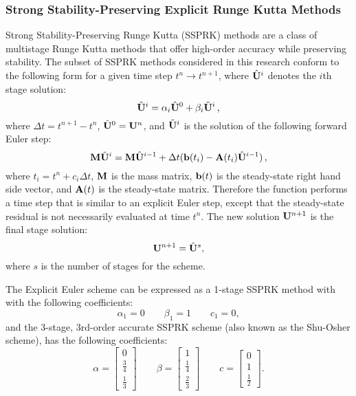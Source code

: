 \subsubsection{Strong Stability-Preserving Explicit Runge Kutta Methods}
\label{ssprk}
Strong Stability-Preserving Runge Kutta (SSPRK) methods are a class of multistage
Runge Kutta methods that offer high-order accuracy while preserving stability.
The subset of SSPRK methods considered in this research conform to the
following form for a given time step $t^n\rightarrow t^{n+1}$,
where $\hat{\mathbf{U}}^i$ denotes the $i$th stage solution:
\begin{equation}
   \hat{\mathbf{U}}^i = \alpha_i\hat{\mathbf{U}}^0
   + \beta_i\tilde{\mathbf{U}}^i \,,
\end{equation}
where $\Delta t=t^{n+1}-t^n$, $\hat{\mathbf{U}}^0=\mathbf{U}^n$,
and $\tilde{\mathbf{U}}^i$ is the solution of the following forward Euler
step:
\begin{equation}
   \mathbf{M}\tilde{\mathbf{U}}^i = \mathbf{M}\hat{\mathbf{U}}^{i-1}
   + \Delta t(\mathbf{b}(t_i) - \mathbf{A}(t_i)\hat{\mathbf{U}}^{i-1}) \,,
\end{equation}
where $t_i = t^n+c_i\Delta t$,
$\mathbf{M}$ is the mass matrix, $\mathbf{b}(t)$ is the steady-state
right hand side vector, and $\mathbf{A}(t)$ is the steady-state matrix.
Therefore the function performs a time step that is similar to an
explicit Euler step, except that the steady-state residual is not
necessarily evaluated at time $t^n$. The new solution $\mathbf{U}^{n+1}$
is the final stage solution:
\begin{equation}
   \mathbf{U}^{n+1} = \hat{\mathbf{U}}^s,
\end{equation}
where $s$ is the number of stages for the scheme.

The Explicit Euler scheme can be expressed as a 1-stage SSPRK method with
with the following coefficients:
\begin{equation}
   \alpha_1 = 0\qquad\beta_1 = 1\qquad c_1 = 0,
\end{equation}
and the 3-stage, 3rd-order accurate SSPRK scheme (also known as the Shu-Osher
scheme), has the following coefficients:
\begin{equation}
   \alpha = \left[\begin{array}{c}0\\\frac{3}{4}\\\frac{1}{3}\end{array}\right]
   \qquad\beta = \left[\begin{array}{c}1\\\frac{1}{4}\\\frac{2}{3}\end{array}\right]
   \qquad c = \left[\begin{array}{c}0\\1\\\frac{1}{2}\end{array}\right].
\end{equation}

